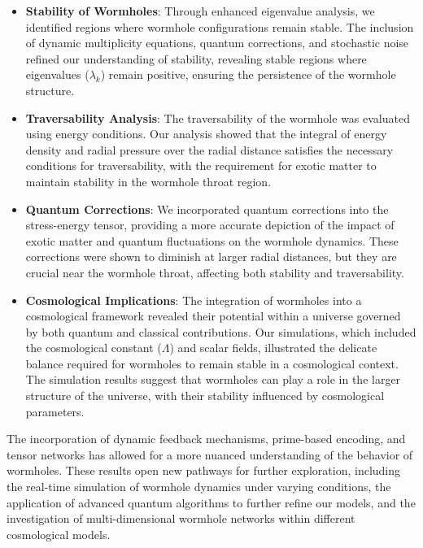 \documentclass{article}
\theoremstyle{plain}
\begin{document}
\begin{itemize}
    \item \textbf{Stability of Wormholes}: Through enhanced eigenvalue analysis, we identified regions where wormhole configurations remain stable. The inclusion of dynamic multiplicity equations, quantum corrections, and stochastic noise refined our understanding of stability, revealing stable regions where eigenvalues (\(\lambda_k\)) remain positive, ensuring the persistence of the wormhole structure.
    \item \textbf{Traversability Analysis}: The traversability of the wormhole was evaluated using energy conditions. Our analysis showed that the integral of energy density and radial pressure over the radial distance satisfies the necessary conditions for traversability, with the requirement for exotic matter to maintain stability in the wormhole throat region.
    \item \textbf{Quantum Corrections}: We incorporated quantum corrections into the stress-energy tensor, providing a more accurate depiction of the impact of exotic matter and quantum fluctuations on the wormhole dynamics. These corrections were shown to diminish at larger radial distances, but they are crucial near the wormhole throat, affecting both stability and traversability.
    \item \textbf{Cosmological Implications}: The integration of wormholes into a cosmological framework revealed their potential within a universe governed by both quantum and classical contributions. Our simulations, which included the cosmological constant (\(\Lambda\)) and scalar fields, illustrated the delicate balance required for wormholes to remain stable in a cosmological context. The simulation results suggest that wormholes can play a role in the larger structure of the universe, with their stability influenced by cosmological parameters.
\end{itemize}

The incorporation of dynamic feedback mechanisms, prime-based encoding, and tensor networks has allowed for a more nuanced understanding of the behavior of wormholes. These results open new pathways for further exploration, including the real-time simulation of wormhole dynamics under varying conditions, the application of advanced quantum algorithms to further refine our models, and the investigation of multi-dimensional wormhole networks within different cosmological models.
\end{document}
